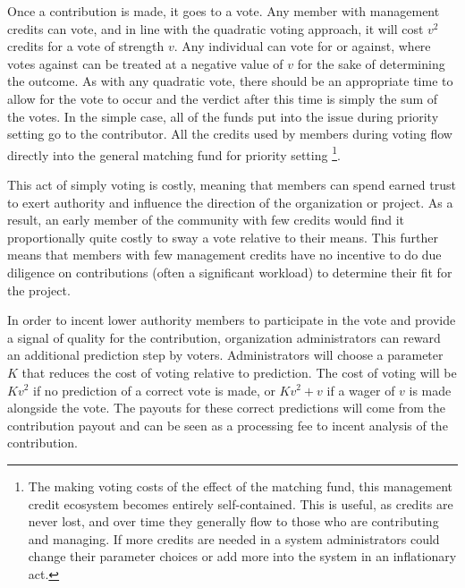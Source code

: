 \documentclass{article}
\begin{document}
Once a contribution is made, it goes to a vote. Any member with management credits can vote, and in line with the quadratic voting approach, it will cost $v^2$ credits for a vote of strength $v$. Any individual can vote for or against, where votes against can be treated at a negative value of $v$ for the sake of determining the outcome. As with any quadratic vote, there should be an appropriate time to allow for the vote to occur and the verdict after this time is simply the sum of the votes. In the simple case, all of the funds put into the issue during priority setting go to the contributor. All the credits used by members during voting flow directly into the general matching fund for priority setting \footnote{The making voting costs of the effect of the matching fund, this management credit ecosystem becomes entirely self-contained. This is useful, as credits are never lost, and over time they generally flow to those who are contributing and managing. If more credits are needed in a system administrators could change their parameter choices or add more into the system in an inflationary act.}.

This act of simply voting is costly, meaning that members can spend earned trust to exert authority and influence the direction of the organization or project. As a result, an early member of the community with few credits would find it proportionally quite costly to sway a vote relative to their means. This further means that members with few management credits have no incentive to do due diligence on contributions (often a significant workload) to determine their fit for the project.

In order to incent lower authority members to participate in the vote and provide a signal of quality for the contribution, organization administrators can reward an additional prediction step by voters. Administrators will choose a parameter $K$ that reduces the cost of voting relative to prediction. The cost of voting will be $K v^2$ if no prediction of a correct vote is made, or $K v^2 + v$ if a wager of $v$ is made alongside the vote. The payouts for these correct predictions will come from the contribution payout and can be seen as a processing fee to incent analysis of the contribution.
\end{document}

